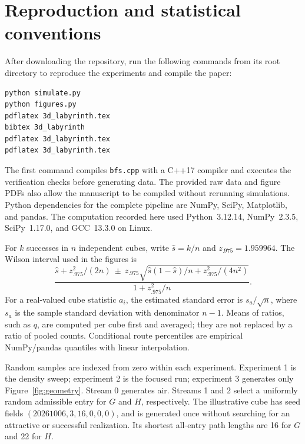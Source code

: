 \documentclass[11pt,letterpaper]{article}
\begin{document}
\section{Reproduction and statistical conventions}
After downloading the repository, run the following commands from its root
directory to reproduce the experiments and compile the paper:
\begin{verbatim}
python simulate.py
python figures.py
pdflatex 3d_labyrinth.tex
bibtex 3d_labyrinth
pdflatex 3d_labyrinth.tex
pdflatex 3d_labyrinth.tex
\end{verbatim}
The first command compiles \texttt{bfs.cpp} with a C++17 compiler and executes
the verification checks before generating data. The provided raw data and
figure PDFs also allow the manuscript to be compiled without rerunning
simulations. Python dependencies for the complete pipeline are NumPy, SciPy,
Matplotlib, and pandas. The computation recorded here used Python~3.12.14,
NumPy~2.3.5, SciPy~1.17.0, and GCC~13.3.0 on Linux.

For $k$ successes in $n$ independent cubes, write $\hat s=k/n$ and
$z_{.975}=1.959964$. The Wilson interval used in the figures is
\begin{equation}
 \frac{\hat s+z_{.975}^2/(2n)
 \ \pm\ z_{.975}\sqrt{\hat s(1-\hat s)/n+z_{.975}^2/(4n^2)}}
 {1+z_{.975}^2/n}.
\end{equation}
For a real-valued cube statistic $a_i$, the estimated standard error is
$s_a/\sqrt{n}$, where $s_a$ is the sample standard deviation with denominator
$n-1$. Means of ratios, such as $q$, are computed per cube first and averaged;
they are not replaced by a ratio of pooled counts. Conditional route
percentiles are empirical NumPy/pandas quantiles with linear interpolation.

Random samples are indexed from zero within each experiment. Experiment 1 is
the density sweep; experiment 2 is the focused run; experiment 3 generates only
Figure~\ref{fig:geometry}. Stream 0 generates air. Streams 1 and 2 select a
uniformly random admissible entry for $G$ and $H$, respectively.
The illustrative cube has seed fields $(20261006,3,16,0,0,0)$, and is generated
once without searching for an attractive or successful realization.
Its shortest all-entry path lengths are 16 for $G$ and 22 for $H$.
\end{document}
